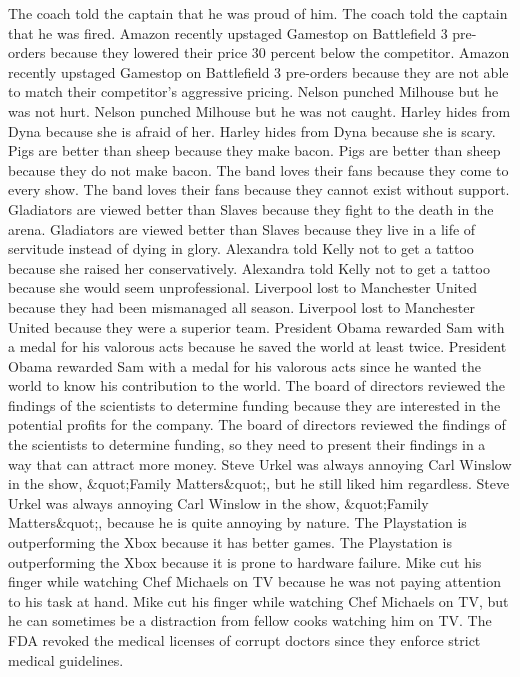 \documentclass{article}
\begin{document}
\begin{enumerate}
	The coach told the captain that he was proud of him.
	The coach told the captain that he was fired.
	Amazon recently upstaged Gamestop on Battlefield 3 pre-orders because they lowered their price 30 percent below the competitor.
	Amazon recently upstaged Gamestop on Battlefield 3 pre-orders because they are not able to match their competitor's aggressive pricing.
	Nelson punched Milhouse but he was not hurt.
	Nelson punched Milhouse but he was not caught.
	Harley hides from Dyna because she is afraid of her.
	Harley hides from Dyna because she is scary.
	Pigs are better than sheep because they make bacon.
	Pigs are better than sheep because they do not make bacon.
	The band loves their fans because they come to every show.
	The band loves their fans because they cannot exist without support.
	Gladiators are viewed better than Slaves because they fight to the death in the arena.
	Gladiators are viewed better than Slaves because they live in a life of servitude instead of dying in glory.
	Alexandra told Kelly not to get a tattoo because she raised her conservatively.
	Alexandra told Kelly not to get a tattoo because she would seem unprofessional.
	Liverpool lost to Manchester United because they had been mismanaged all season.
	Liverpool lost to Manchester United because they were a superior team.
	President Obama rewarded Sam with a medal for his valorous acts because he saved the world at least twice.
	President Obama rewarded Sam with a medal for his valorous acts since he wanted the world to know his contribution to the world.
	The board of directors reviewed the findings of the scientists to determine funding because they are interested in the potential profits for the company.
	The board of directors reviewed the findings of the scientists to determine funding, so they need to present their findings in a way that can attract more money.
	Steve Urkel was always annoying Carl Winslow in the show, &quot;Family Matters&quot;, but he still liked him regardless.
	Steve Urkel was always annoying Carl Winslow in the show, &quot;Family Matters&quot;, because he is quite annoying by nature.
	The Playstation is outperforming the Xbox because it has better games.
	The Playstation is outperforming the Xbox because it is prone to hardware failure.
	Mike cut his finger while watching Chef Michaels on TV because he was not paying attention to his task at hand.
	Mike cut his finger while watching Chef Michaels on TV, but he can sometimes be a distraction from fellow cooks watching him on TV.
	The FDA revoked the medical licenses of corrupt doctors since they enforce strict medical guidelines.

\end{enumerate}
\end{document}
